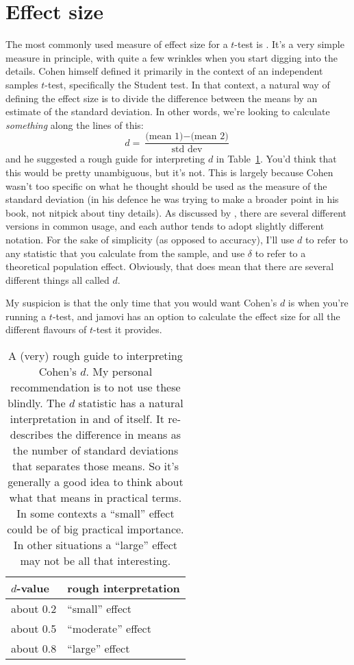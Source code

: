 \section{Effect size~\label{sec:cohensd}}

The most commonly used measure of effect size for a $t$-test is  \parencite{Cohen1988}. It's a very simple measure in principle, with quite a few wrinkles when you start digging into the details. Cohen himself defined it primarily in the context of an independent samples $t$-test, specifically the Student test. In that context, a natural way of defining the effect size is to divide the difference between the means by an estimate of the standard deviation. In other words, we're looking to calculate {\it something} along the lines of this:
$$
d = \frac{\mbox{(mean 1)} - \mbox{(mean 2)}}{\mbox{std dev}}
$$
and he suggested a rough guide for interpreting $d$ in Table~\ref{tab:cohensdinterpretation}. You'd think that this would be pretty unambiguous, but it's not. This is largely because Cohen wasn't too specific on what he thought should be used as the measure of the standard deviation (in his defence he was trying to make a broader point in his book, not nitpick about tiny details). As discussed by \textcite{McGrath2006}, there are several different versions in common usage, and each author tends to adopt slightly different notation. For the sake of simplicity (as opposed to accuracy), I'll use $d$ to refer to any statistic that you calculate from the sample, and  use $\delta$ to refer to a theoretical population effect. Obviously, that does mean that there are several different things all called $d$. 

My suspicion is that the only time that you would want Cohen's $d$ is when you're running a $t$-test, and jamovi has an option to calculate the effect size for all the different flavours of $t$-test it provides. 

\begin{table}[t]
\caption{A (very) rough guide to interpreting Cohen's $d$. My personal recommendation is to not use these blindly. The $d$ statistic has a natural interpretation in and of itself. It re-describes the difference in means as the number of standard deviations that separates those means. So it's generally a good idea to think about what that means in practical terms. In some contexts a ``small'' effect could be of big practical importance. In other situations a ``large'' effect may not be all that interesting.} 
\label{tab:cohensdinterpretation}
\centering
\vspace*{6pt}
\begin{tabular}{l|l}
$d$-value & rough interpretation \\ \hline
about 0.2 & ``small'' effect  \\
about 0.5 & ``moderate'' effect \\
about 0.8 & ``large'' effect 
\end{tabular}
\vspace*{6pt}
\HR
\end{table}


